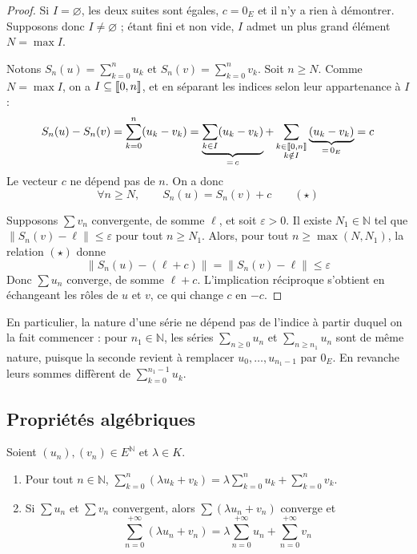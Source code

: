 \begin{proof}
Si $I=\varnothing$, les deux suites sont égales, $c=0_E$ et il n'y a rien à démontrer. Supposons donc $I\neq\varnothing$ ; étant fini et non vide, $I$ admet un plus grand élément $N=\max I$.

Notons $S_n(u)=\sum_{k=0}^n u_k$ et $S_n(v)=\sum_{k=0}^n v_k$. Soit $n\geq N$. Comme $N=\max I$, on a $I\subseteq\llbracket 0,n \rrbracket$, et en séparant les indices selon leur appartenance à $I$ :
\[S_n(u)-S_n(v) = \sum_{k=0}^{n}(u_k-v_k) = \underbrace{\sum_{k\in I}(u_k-v_k)}_{=\,c} + \sum_{\substack{k\in\llbracket 0,n \rrbracket\\ k\notin I}}\underbrace{(u_k-v_k)}_{=\,0_E} = c\]
Le vecteur $c$ ne dépend pas de $n$. On a donc
\[\forall n\geq N,\qquad S_n(u)=S_n(v)+c \qquad (\star)\]

Supposons $\sum v_n$ convergente, de somme $\ell$, et soit $\varepsilon>0$. Il existe $N_1\in\mathbb{N}$ tel que $\|S_n(v)-\ell\|\leq\varepsilon$ pour tout $n\geq N_1$. Alors, pour tout $n\geq\max(N,N_1)$, la relation $(\star)$ donne
\[\|S_n(u)-(\ell+c)\| = \|S_n(v)-\ell\| \leq \varepsilon\]
Donc $\sum u_n$ converge, de somme $\ell+c$. L'implication réciproque s'obtient en échangeant les rôles de $u$ et $v$, ce qui change $c$ en $-c$.
\end{proof}

\begin{remarque}
En particulier, la nature d'une série ne dépend pas de l'indice à partir duquel on la fait commencer : pour $n_1\in\mathbb{N}$, les séries $\sum_{n\geq 0}u_n$ et $\sum_{n\geq n_1}u_n$ sont de même nature, puisque la seconde revient à remplacer $u_0,\dots,u_{n_1-1}$ par $0_E$. En revanche leurs sommes diffèrent de $\sum_{k=0}^{n_1-1}u_k$.
\end{remarque}

\subsection{Propriétés algébriques}
\label{subsec:proprietes-algebriques}

\begin{prop}[Linéarité]
\label{prop:linearite}
Soient $(u_n),(v_n)\in E^{\mathbb{N}}$ et $\lambda\in K$.
\begin{enumerate}
\item Pour tout $n\in\mathbb{N}$, $\displaystyle\sum_{k=0}^{n}(\lambda u_k+v_k)=\lambda\sum_{k=0}^{n}u_k+\sum_{k=0}^{n}v_k$.
\item Si $\sum u_n$ et $\sum v_n$ convergent, alors $\sum(\lambda u_n+v_n)$ converge et
\[\sum_{n=0}^{+\infty}(\lambda u_n+v_n) = \lambda\sum_{n=0}^{+\infty}u_n + \sum_{n=0}^{+\infty}v_n\]
\end{enumerate}
\end{prop}

